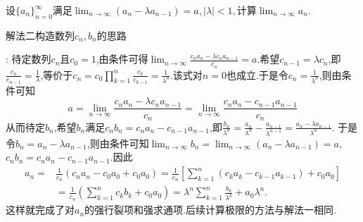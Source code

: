 \documentclass[../../main.tex]{subfiles}%
\begin{document}
\begin{example}\label{example:4.341111}
设\(\{a_n\}_{n = 0}^{\infty}\)满足\(\lim_{n\rightarrow \infty} (a_n-\lambda a_{n-1})=a,|\lambda |<1,\text{计算}\lim_{n\rightarrow \infty} a_n\).
\end{example}
\begin{note}
\hypertarget{递推条件是极限形式的待定数列法}{{\color{blue}解法二}构造数列$c_n,b_n$的思路}:
待定数列$c_n$且$c_0=1$,由条件可得\(\lim_{n\rightarrow \infty}\frac{c_na_n - \lambda c_na_{n - 1}}{c_n}=a\).希望\(c_{n - 1}=\lambda c_n\),即\(\frac{c_n}{c_{n - 1}}=\frac{1}{\lambda}\),等价于\(c_n = c_0\prod_{k = 1}^n{\frac{c_k}{c_{k - 1}}}=\frac{1}{\lambda ^n}\).该式对\(n = 0\)也成立.于是令\(c_n=\frac{1}{\lambda ^n}\),则由条件可知
\[
a=\lim_{n\rightarrow \infty}\frac{c_na_n - \lambda c_na_{n - 1}}{c_n}=\lim_{n\rightarrow \infty}\frac{c_na_n - c_{n - 1}a_{n - 1}}{c_n}
\]
从而待定\(b_n\),希望\(b_n\)满足\(c_nb_n = c_na_n - c_{n - 1}a_{n - 1}\),即\(\frac{b_n}{\lambda ^n}=\frac{a_n}{\lambda ^n}-\frac{a_{n - 1}}{\lambda ^{n - 1}}=\frac{a_n - \lambda a_{n - 1}}{\lambda ^n}\).
于是令\(b_n = a_n - \lambda a_{n - 1}\),则由条件可知\(\lim_{n\rightarrow \infty}b_n=\lim_{n\rightarrow \infty}(a_n - \lambda a_{n - 1}) = a\),\(c_nb_n = c_na_n - c_{n - 1}a_{n-1}\).因此
\begin{align*}
a_n=&\frac{1}{c_n}\left( c_na_n-c_0a_0+c_0a_0 \right) =\frac{1}{c_n}\left[ \sum_{k=1}^n{\left( c_ka_k-c_{k-1}a_{k-1} \right)}+c_0a_0 \right] 
\\
&=\frac{1}{c_n}\left( \sum_{k=1}^n{c_kb_k}+c_0a_0 \right) =\lambda ^n\sum_{k=1}^n{\frac{b_k}{\lambda ^k}}+a_0\lambda ^n.
\end{align*}
这样就完成了对\(a_n\)的强行裂项和强求通项.后续计算极限的方法与{\color{blue}解法一}相同.
\end{note}
\end{document}
